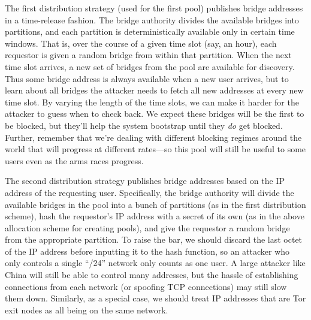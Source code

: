 \documentclass{llncs}
\begin{document}
%

The first distribution strategy (used for the first pool) publishes bridge
addresses in a time-release fashion. The bridge authority divides the
available bridges into partitions, and each partition is deterministically
available only in certain time windows. That is, over the course of a
given time slot (say, an hour), each requestor is given a random bridge
from within that partition. When the next time slot arrives, a new set
of bridges from the pool are available for discovery. Thus some bridge
address is always available when a new
user arrives, but to learn about all bridges the attacker needs to fetch
all new addresses at every new time slot. By varying the length of the
time slots, we can make it harder for the attacker to guess when to check
back. We expect these bridges will be the first to be blocked, but they'll
help the system bootstrap until they \emph{do} get blocked. Further,
remember that we're dealing with different blocking regimes around the
world that will progress at different rates---so this pool will still
be useful to some users even as the arms races progress.

The second distribution strategy publishes bridge addresses based on the IP
address of the requesting user. Specifically, the bridge authority will
divide the available bridges in the pool into a bunch of partitions
(as in the first distribution scheme), hash the requestor's IP address
with a secret of its own (as in the above allocation scheme for creating
pools), and give the requestor a random bridge from the appropriate
partition. To raise the bar, we should discard the last octet of the
IP address before inputting it to the hash function, so an attacker
who only controls a single ``/24'' network only counts as one user. A
large attacker like China will still be able to control many addresses,
but the hassle of establishing connections from each network (or spoofing
TCP connections) may still slow them down. Similarly, as a special case,
we should treat IP addresses that are Tor exit nodes as all being on
the same network.
\end{document}
